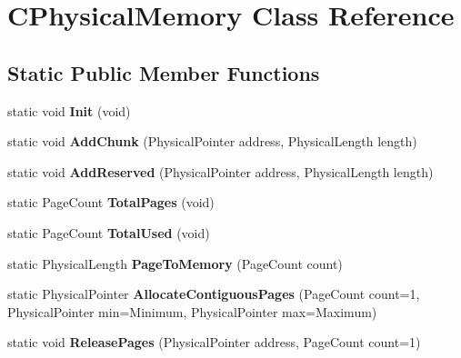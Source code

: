 \hypertarget{class_c_physical_memory}{}\section{C\+Physical\+Memory Class Reference}
\label{class_c_physical_memory}
\subsection*{Static Public Member Functions}
\begin{DoxyCompactItemize}
\item 
\mbox{\label{class_c_physical_memory_aa6f7f1f81b45fcd3080edafd8b26a259}} 
static void {\bfseries Init} (void)
\item 
\mbox{\label{class_c_physical_memory_aca270fd44f76f3e63ab080aa1631d8da}} 
static void {\bfseries Add\+Chunk} (Physical\+Pointer address, Physical\+Length length)
\item 
\mbox{\label{class_c_physical_memory_a11ad72548c3cd1f1b58459865ce6f528}} 
static void {\bfseries Add\+Reserved} (Physical\+Pointer address, Physical\+Length length)
\item 
\mbox{\label{class_c_physical_memory_aa29f1a8030d46ea20749557fe571b21a}} 
static Page\+Count {\bfseries Total\+Pages} (void)
\item 
\mbox{\label{class_c_physical_memory_af49bfb8e23a2f279b109f8c45e0ff775}} 
static Page\+Count {\bfseries Total\+Used} (void)
\item 
\mbox{\label{class_c_physical_memory_adbb6eb520e69ec3384871fd3f4571e17}} 
static Physical\+Length {\bfseries Page\+To\+Memory} (Page\+Count count)
\item 
\mbox{\label{class_c_physical_memory_ad752abd9f704b7c29cad88da372d3f7d}} 
static Physical\+Pointer {\bfseries Allocate\+Contiguous\+Pages} (Page\+Count count=1, Physical\+Pointer min=Minimum, Physical\+Pointer max=Maximum)
\item 
\mbox{\label{class_c_physical_memory_a137a04ac68d4bb5584d0c4689e3affd0}} 
static void {\bfseries Release\+Pages} (Physical\+Pointer address, Page\+Count count=1)
\end{DoxyCompactItemize}
